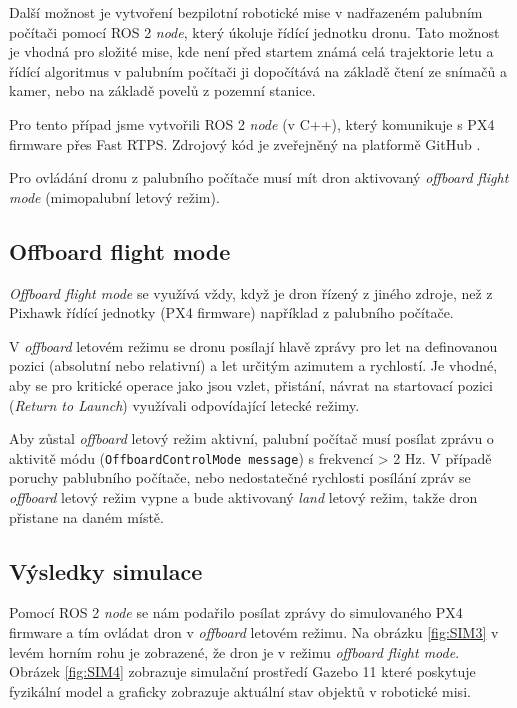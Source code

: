 Další možnost je vytvoření bezpilotní robotické mise v nadřazeném palubním počítači pomocí ROS 2 \textit{node}, který úkoluje řídící jednotku dronu. Tato možnost je vhodná pro složité mise, kde není před startem známá celá trajektorie letu a řídící algoritmus v palubním počítači ji dopočítává na základě čtení ze snímačů a kamer, nebo na základě povelů z pozemní stanice.

Pro tento případ jsme vytvořili ROS 2 \textit{node} (v C++), který komunikuje s PX4 firmware přes Fast RTPS. Zdrojový kód je zveřejněný na platformě GitHub \cite{GIT}.

Pro ovládání dronu z palubního počítače musí mít dron aktivovaný \textit{offboard flight mode} (mimopalubní letový režim).

\subsection{Offboard flight mode}

\textit{Offboard flight mode} se využívá vždy, když je dron řízený z jiného zdroje, než z Pixhawk řídící jednotky (PX4 firmware) například z palubního počítače. 

V \textit{offboard} letovém režimu se dronu posílají hlavě zprávy pro let na definovanou pozici (absolutní nebo relativní) a let určitým azimutem a rychlostí. Je vhodné, aby se pro kritické operace jako jsou vzlet, přistání, návrat na startovací pozici (\textit{Return to Launch}) využívali odpovídající letecké režimy.

Aby zůstal \textit{offboard} letový režim aktivní, palubní počítač musí posílat zprávu o aktivitě módu (\texttt{OffboardControlMode message}) s frekvencí > 2 Hz. V případě poruchy pablubního počítače, nebo nedostatečné rychlosti posílání zpráv se \textit{offboard} letový režim vypne a bude aktivovaný \textit{land} letový režim, takže dron přistane na daném místě. \cite{OFFBOADR}

\subsection{Výsledky simulace}

Pomocí ROS 2 \textit{node} se nám podařilo posílat zprávy do simulovaného PX4 firmware a tím ovládat dron v \textit{offboard} letovém režimu. Na obrázku \ref{fig:SIM3} v levém horním rohu je zobrazené, že dron je v režimu \textit{offboard flight mode}. Obrázek \ref{fig:SIM4} zobrazuje simulační prostředí Gazebo 11 které poskytuje fyzikální model  a graficky zobrazuje aktuální stav objektů v robotické misi.

